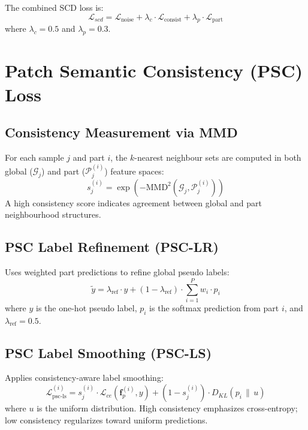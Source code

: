 The combined SCD loss is:
\begin{equation}
    \mathcal{L}_{scd} = \mathcal{L}_{\text{noise}} + \lambda_c \cdot \mathcal{L}_{\text{consist}} + \lambda_p \cdot \mathcal{L}_{\text{part}}
\end{equation}
where $\lambda_c = 0.5$ and $\lambda_p = 0.3$.

\section{Patch Semantic Consistency (PSC) Loss}

\subsection{Consistency Measurement via MMD}
For each sample $j$ and part $i$, the $k$-nearest neighbour sets are computed in both global ($\mathcal{G}_j$) and part ($\mathcal{P}_j^{(i)}$) feature spaces:
\begin{equation}
    s_j^{(i)} = \exp\left(-\text{MMD}^2(\mathcal{G}_j, \mathcal{P}_j^{(i)})\right)
\end{equation}
A high consistency score indicates agreement between global and part neighbourhood structures.

\subsection{PSC Label Refinement (PSC-LR)}
Uses weighted part predictions to refine global pseudo labels:
\begin{equation}
    \tilde{y} = \lambda_{\text{ref}} \cdot y + (1 - \lambda_{\text{ref}}) \cdot \sum_{i=1}^{P} w_i \cdot p_i
\end{equation}
where $y$ is the one-hot pseudo label, $p_i$ is the softmax prediction from part $i$, and $\lambda_{\text{ref}} = 0.5$.

\subsection{PSC Label Smoothing (PSC-LS)}
Applies consistency-aware label smoothing:
\begin{equation}
    \mathcal{L}_{\text{psc-ls}}^{(i)} = s_j^{(i)} \cdot \mathcal{L}_{ce}(\mathbf{f}_p^{(i)}, y) + (1 - s_j^{(i)}) \cdot D_{KL}(p_i \,\|\, u)
\end{equation}
where $u$ is the uniform distribution. High consistency emphasizes cross-entropy; low consistency regularizes toward uniform predictions.

